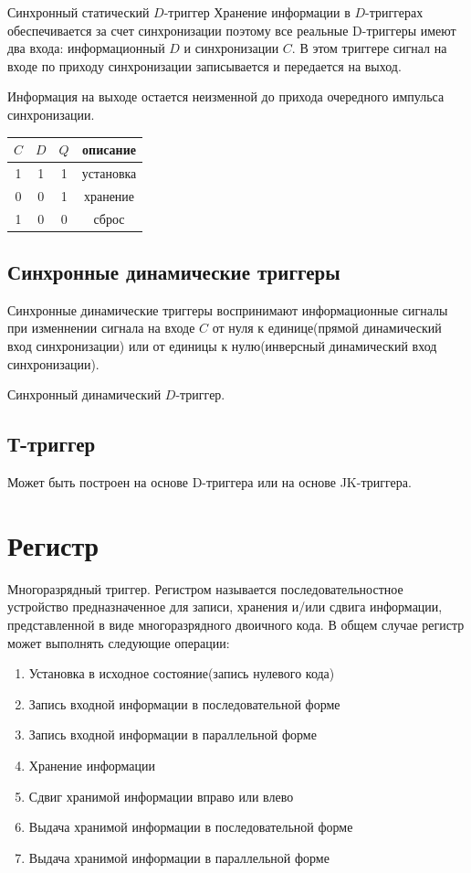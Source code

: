 \documentclass[a4paper]{article}
\begin{document}
Синхронный статический $D$-триггер
Хранение информации в $D$-триггерах обеспечивается за счет синхронизации поэтому все реальные D-триггеры имеют два входа: информационный $D$ и синхронизации $C$. В этом триггере сигнал на входе по приходу синхронизации записывается и передается на выход.

Информация на выходе остается неизменной до прихода очередного импульса синхронизации. 

\begin{table}[ht]
\centering
\begin{tabular}{|c|c|c|c|}
    \hline
    $C$ & $D$ & $Q$  & описание \\
    \hline
    1 & 1 & 1 & установка\\
    0 & 0 & 1 & хранение \\
    1 & 0 & 0 & сброс \\
    \hline
\end{tabular}
\end{table}

\subsection{Синхронные динамические триггеры}
Синхронные динамические триггеры воспринимают информационные сигналы при изменнении сигнала на входе $C$
от нуля к единице(прямой динамический вход синхронизации) или от единицы к нулю(инверсный динамический вход синхронизации).

Синхронный динамический $D$-триггер. 

\subsection{Т-триггер}
Может быть построен на основе D-триггера или на основе JK-триггера.

\section{Регистр}
Многоразрядный триггер. 
Регистром называется последовательностное устройство предназначенное для записи, хранения и/или сдвига информации, представленной в виде многоразрядного двоичного кода. В общем случае регистр может выполнять следующие операции:
\begin{enumerate}
    \item Установка в исходное состояние(запись нулевого кода)
    \item Запись входной информации в последовательной форме
    \item Запись входной информации в параллельной форме
    \item Хранение информации
    \item Сдвиг хранимой информации вправо или влево
    \item Выдача хранимой информации в последовательной форме
    \item Выдача хранимой информации в параллельной форме
\end{enumerate}
\end{document}
